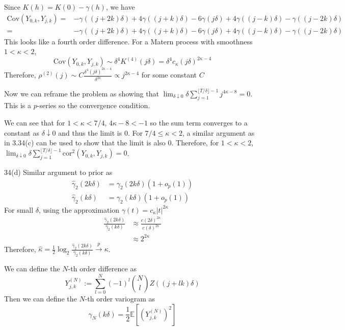 \documentclass{article}
\begin{document}
Since $K(h) = K(0) - \gamma(h)$, we have
\begin{align*}
    \text{Cov}(Y_{0,k}, Y_{j,k}) =& -\gamma((j+2k)\delta) + 4\gamma((j+k)\delta) - 6\gamma(j\delta) + 4\gamma((j-k)\delta) - \gamma((j-2k)\delta) \\
    =& -\gamma((j+2k)\delta) + 4\gamma((j+k)\delta) - 6\gamma(j\delta) + 4\gamma((j-k)\delta) - \gamma((j-2k)\delta)
\end{align*}
This looks like a fourth order difference. For a Matern process with smoothness $1<\kappa<2$, 
$$ \text{Cov}(Y_{0,k}, Y_{j,k}) \sim \delta^4 K^{(4)}(j\delta) = \delta^4 c_{\kappa} (j\delta)^{2\kappa-4}$$
Therefore, $\rho^{(2)}(j) \sim C\frac{\delta^4 (j\delta)^{2\kappa -4}}{\delta^{2\kappa}} \propto j^{2\kappa -4}$ for some constant $C$ 

Now we can reframe the problem as showing that $\lim_{\delta \downarrow 0} \delta \sum_{j=1}^{\lfloor T/\delta \rfloor - 1} j^{4\kappa -8} = 0$. This is a $p$-series so the convergence condition.

We can see that for $1<\kappa<7/4$, $4\kappa - 8 < -1$ so the sum term converges to a constant as $\delta\downarrow 0$ and thus the limit is 0. For $7/4 \leq \kappa < 2$, a similar argument as in 3.34(c) can be used to show that the limit is also 0. Therefore, for $1<\kappa<2$, $\lim_{\delta \downarrow 0} \delta \sum_{j=1}^{\lfloor T/\delta \rfloor - 1} \text{cor}^2(Y_{0,k}, Y_{j,k}) = 0$.

34(d)
Similar argument to prior as
\begin{align*}
    \hat \gamma_2(2k\delta) &= \gamma_2(2k\delta)(1 + o_p(1)) \\
    \hat \gamma_2(k\delta) &= \gamma_2(k\delta)(1 + o_p(1))
\end{align*}
For small $\delta$, using the approximation $\gamma(t) = c_{\kappa} |t|^{2\kappa} $ 
\begin{align*}
    \frac{\hat \gamma_2(2k\delta)}{\hat \gamma_2(k\delta)} &\approx \frac{c (2\delta)^{2\kappa}}{c (\delta)^{2\kappa}} \\
    &\approx 2^{2\kappa}
\end{align*}
Therefore, $\hat \kappa = \frac{1}{2} \log_2 \frac{\hat \gamma_2(2k\delta)}{\hat \gamma_2(k\delta)} \xrightarrow{p} \kappa$.



We can define the $N$-th order difference as
$$ Y_{j,k}^{(N)} := \sum_{l=0}^{N} (-1)^l \binom{N}{l} Z((j+lk)\delta) $$
Then we can define the $N$-th order variogram as $$\gamma_N(k\delta) = \frac{1}{2} \mathbb{E}[(Y_{j,k}^{(N)})^2]$$
\end{document}
